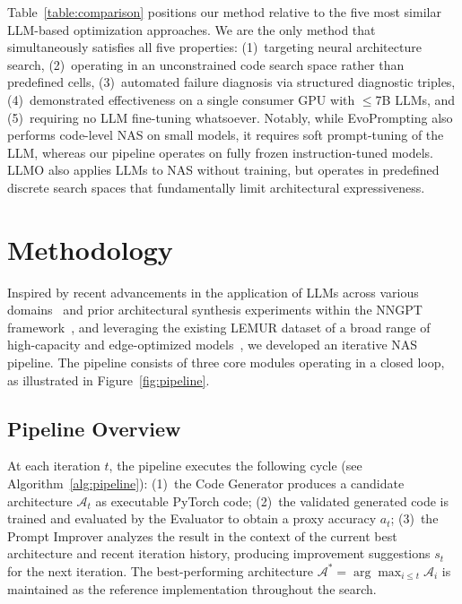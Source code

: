 \documentclass[10pt,twocolumn,letterpaper]{article}
\begin{document}
	Table~\ref{table:comparison} positions our method relative to the five most similar LLM-based optimization approaches. We are the only method that simultaneously satisfies all five properties: (1)~targeting neural architecture search, (2)~operating in an unconstrained code search space rather than predefined cells, (3)~automated failure diagnosis via structured diagnostic triples, (4)~demonstrated effectiveness on a single consumer GPU with $\leq$7B LLMs, and (5)~requiring no LLM fine-tuning whatsoever. Notably, while EvoPrompting also performs code-level NAS on small models, it requires soft prompt-tuning of the LLM, whereas our pipeline operates on fully frozen instruction-tuned models. LLMO also applies LLMs to NAS without training, but operates in predefined discrete search spaces that fundamentally limit architectural expressiveness.

	\section{Methodology}
	\label{sec:Methodology}
	
	Inspired by recent advancements in the application of LLMs across various domains~\cite{ABrain.HPGPT,Gado2025llm,Rupani2025llm,ABrain.NN-RAG} and prior architectural synthesis experiments within the NNGPT framework~\cite{ABrain.HPGPT,ABrain.NN-Captioning_2025,ABrain.Prompt,ABrain.NNGPT-Fractal,ABrain.Transform,ABrain.Architect,ABrain.CV_Channel}, and leveraging the existing LEMUR dataset of a broad range of high-capacity and edge-optimized models~\cite{ABrain.NN-Dataset,ABrain.LEMUR2,ABrain.NN-Lite}, we developed an iterative NAS pipeline. The pipeline consists of three core modules operating in a closed loop, as illustrated in Figure~\ref{fig:pipeline}.
	
	\subsection{Pipeline Overview}
	
	At each iteration $t$, the pipeline executes the following cycle (see Algorithm~\ref{alg:pipeline}): (1)~the Code Generator produces a candidate architecture $\mathcal{A}_t$ as executable PyTorch code; (2)~the validated generated code is trained and evaluated by the Evaluator to obtain a proxy accuracy $a_t$; (3)~the Prompt Improver analyzes the result in the context of the current best architecture and recent iteration history, producing improvement suggestions $s_t$ for the next iteration. The best-performing architecture $\mathcal{A}^* = \arg\max_{i \leq t} \mathcal{A}_i$ is maintained as the reference implementation throughout the search.
	
\end{document}
